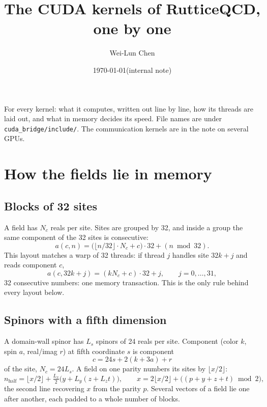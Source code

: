 \documentclass[11pt,a4paper]{article}
\title{The CUDA kernels of RutticeQCD, one by one}
\author{Wei-Lun Chen}
\date{\today\quad(internal note)}
\numberwithin{equation}{section}
\newcommand{\code}[1]{\texttt{\small #1}}
\begin{document}
\maketitle

\noindent For every kernel: what it computes, written out line by line, how its threads are laid
out, and what in memory decides its speed. File names are under \code{cuda\_bridge/include/}.
The communication kernels are in the note on several GPUs.

\tableofcontents

\section{How the fields lie in memory}

\subsection{Blocks of 32 sites}

A field has $N_c$ reals per site. Sites are grouped by 32, and inside a group the same component
of the 32 sites is consecutive:
\begin{equation}
a(c,n) = \big(\lfloor n/32\rfloor\cdot N_c + c\big)\cdot 32 + (n \bmod 32).
\label{eq:aosoa}
\end{equation}
This layout matches a warp of 32 threads: if thread $j$ handles site $32k+j$ and reads component $c$,
\begin{equation}
a(c,32k+j) = (kN_c+c)\cdot32 + j,\qquad j=0,\dots,31,
\end{equation}
32 consecutive numbers: one memory transaction. This is the only rule behind every layout below.

\subsection{Spinors with a fifth dimension}

A domain-wall spinor has $L_s$ spinors of 24 reals per site. Component (color $k$, spin $a$,
real/imag $r$) at fifth coordinate $s$ is component
\begin{equation}
c = 24s + 2(k + 3a) + r
\end{equation}
of the site, $N_c=24L_s$. A field on one parity numbers its sites by $\lfloor x/2\rfloor$:
\begin{equation}
n_{\text{half}} = \lfloor x/2\rfloor + \tfrac{L_x}{2}\big(y+L_y(z+L_zt)\big),\qquad
x = 2\lfloor x/2\rfloor + \big((p+y+z+t)\bmod 2\big),
\end{equation}
the second line recovering $x$ from the parity $p$. Several vectors of a field lie one after
another, each padded to a whole number of blocks.
\end{document}
